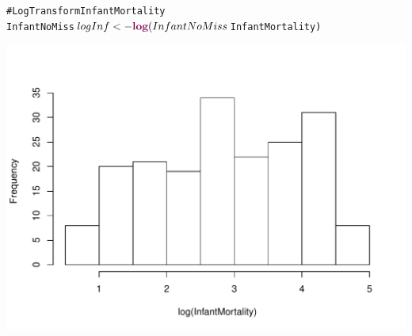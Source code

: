 \documentclass{beamer}\usepackage{graphicx, color}
\makeatletter
\def\maxwidth{ %
  \ifdim\Gin@nat@width>\linewidth
    \linewidth
  \else
    \Gin@nat@width
  \fi
}
\newcommand{\hlfunctioncall}[1]{\textcolor[rgb]{0.501960784313725,0,0.329411764705882}{\textbf{#1}}}%
\newcommand{\hlcomment}[1]{\textcolor[rgb]{0.180392156862745,0.6,0.341176470588235}{#1}}%
\newenvironment{kframe}{%
 \def\at@end@of@kframe{}%
 \ifinner\ifhmode%
  \def\at@end@of@kframe{\end{minipage}}%
  \begin{minipage}{\columnwidth}%
 \fi\fi%
 \def\FrameCommand##1{\hskip\@totalleftmargin \hskip-\fboxsep
 \colorbox{shadecolor}{##1}\hskip-\fboxsep
     \hskip-\linewidth \hskip-\@totalleftmargin \hskip\columnwidth}%
 \MakeFramed {\advance\hsize-\width
   \@totalleftmargin\z@ \linewidth\hsize
   \@setminipage}}%
 {\par\unskip\endMakeFramed%
 \at@end@of@kframe}
\newenvironment{knitrout}{}{} %
\makeatother
\begin{document}
\begin{frame}
\begin{knitrout}
\color{fgcolor}\begin{kframe}
\begin{alltt}
\hlcomment{# Log Transform InfantMortality}
InfantNoMiss$logInf <- \hlfunctioncall{log}(
                        InfantNoMiss$InfantMortality)
\end{alltt}
\end{kframe}
\end{knitrout}


\begin{knitrout}
\color{fgcolor}

{\centering \includegraphics[width=\maxwidth]{figure/LogTransformScatter} 

}


\end{knitrout}

\end{frame}
\end{document}

